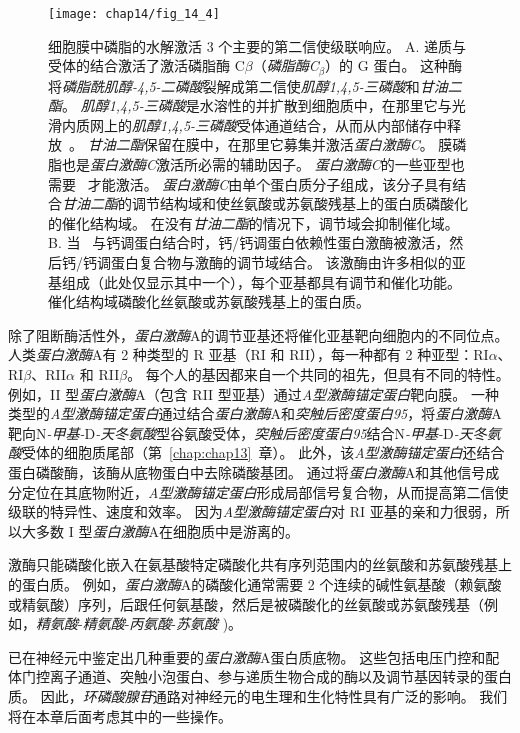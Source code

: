 \begin{figure}[htbp]
	\centering
	\texttt{[image: chap14/fig\_14\_4]}
	\caption{细胞膜中磷脂的水解激活 3 个主要的第二信使级联响应。
		A. 递质与受体的结合激活了激活磷脂酶 C$\beta$（\textit{磷脂酶C}$_\beta$）的 G 蛋白。
		这种酶将\textit{磷脂酰肌醇-4,5-二磷酸}裂解成第二信使\textit{肌醇1,4,5-三磷酸}和\textit{甘油二酯}。
		\textit{肌醇1,4,5-三磷酸}是水溶性的并扩散到细胞质中，在那里它与光滑内质网上的\textit{肌醇1,4,5-三磷酸}受体通道结合，从而从内部储存中释放~。
		\textit{甘油二酯}保留在膜中，在那里它募集并激活\textit{蛋白激酶C}。
		膜磷脂也是\textit{蛋白激酶C}激活所必需的辅助因子。
		\textit{蛋白激酶C}的一些亚型也需要~ 才能激活。
		\textit{蛋白激酶C}由单个蛋白质分子组成，该分子具有结合\textit{甘油二酯}的调节结构域和使丝氨酸或苏氨酸残基上的蛋白质磷酸化的催化结构域。
		在没有\textit{甘油二酯}的情况下，调节域会抑制催化域。
		B. 当~ 与钙调蛋白结合时，钙/钙调蛋白依赖性蛋白激酶被激活，然后钙/钙调蛋白复合物与激酶的调节域结合。
		该激酶由许多相似的亚基组成（此处仅显示其中一个），每个亚基都具有调节和催化功能。
		催化结构域磷酸化丝氨酸或苏氨酸残基上的蛋白质。}
	\label{fig:14_4}
\end{figure}


除了阻断酶活性外，\textit{蛋白激酶}A的调节亚基还将催化亚基靶向细胞内的不同位点。
人类\textit{蛋白激酶}A有 2 种类型的 R 亚基（RI 和 RII），每一种都有 2 种亚型：RI$\alpha$、RI$\beta$、RII$\alpha$ 和 RII$\beta$。
每个人的基因都来自一个共同的祖先，但具有不同的特性。
例如，II 型\textit{蛋白激酶}A（包含 RII 型亚基）通过\textit{A型激酶锚定蛋白}靶向膜。
一种类型的\textit{A型激酶锚定蛋白}通过结合\textit{蛋白激酶}A和\textit{突触后密度蛋白95}，将\textit{蛋白激酶}A靶向N\textit{-甲基-}D\textit{-天冬氨酸}型谷氨酸受体，\textit{突触后密度蛋白95}结合N\textit{-甲基-}D\textit{-天冬氨酸}受体的细胞质尾部（第~\ref{chap:chap13}~章）。
此外，该\textit{A型激酶锚定蛋白}还结合蛋白磷酸酶，该酶从底物蛋白中去除磷酸基团。
通过将\textit{蛋白激酶}A和其他信号成分定位在其底物附近，\textit{A型激酶锚定蛋白}形成局部信号复合物，从而提高第二信使级联的特异性、速度和效率。
因为\textit{A型激酶锚定蛋白}对 RI 亚基的亲和力很弱，所以大多数 I 型\textit{蛋白激酶}A在细胞质中是游离的。


激酶只能磷酸化嵌入在氨基酸特定磷酸化共有序列范围内的丝氨酸和苏氨酸残基上的蛋白质。
例如，\textit{蛋白激酶}A的磷酸化通常需要 2 个连续的碱性氨基酸（赖氨酸或精氨酸）序列，后跟任何氨基酸，然后是被磷酸化的丝氨酸或苏氨酸残基（例如，\textit{精氨酸}-\textit{精氨酸}-\textit{丙氨酸}-\textit{苏氨酸} )。


已在神经元中鉴定出几种重要的\textit{蛋白激酶}A蛋白质底物。
这些包括电压门控和配体门控离子通道、突触小泡蛋白、参与递质生物合成的酶以及调节基因转录的蛋白质。
因此，\textit{环磷酸腺苷}通路对神经元的电生理和生化特性具有广泛的影响。
我们将在本章后面考虑其中的一些操作。




